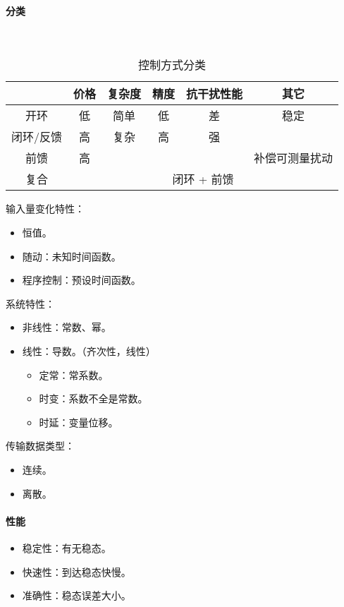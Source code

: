 \documentclass[
12pt, %
a4paper, 
oneside, %
headinclude,footinclude, %
]{scrartcl}
\begin{document}
\paragraph{分类}~\\
\begin{table}[H]
\centering
\begin{tabular}{|c|c|c|c|c|c|}
\hline
& 价格 & 复杂度 & 精度 & 抗干扰性能 & 其它 \\
\hline
开环 & 低 & 简单 & 低 & 差 & 稳定 \\
\hline
闭环/反馈 & 高 & 复杂 & 高 & 强 & \\
\hline
前馈 & 高 & & & & 补偿可测量扰动 \\
\hline
复合 & \multicolumn{5}{c|}{闭环 + 前馈} \\
\hline
\end{tabular}
\caption{控制方式分类}
\end{table}

\begin{minipage}[t]{0.35\textwidth}
输入量变化特性：
\begin{itemize}
\item 恒值。
\item 随动：未知时间函数。
\item 程序控制：预设时间函数。
\end{itemize}
\end{minipage}
\begin{minipage}[t]{0.35\textwidth}
系统特性：
\begin{itemize}
\item 非线性：常数、幂。
\item 线性：导数。（齐次性，线性）
\begin{itemize}
\item 定常：常系数。
\item 时变：系数不全是常数。
\item 时延：变量位移。
\end{itemize}
\end{itemize}
\end{minipage}
\begin{minipage}[t]{0.3\textwidth}
传输数据类型：
\begin{itemize}
\item 连续。
\item 离散。
\end{itemize}
\end{minipage}
\paragraph{性能}
\begin{itemize}
\item 稳定性：有无稳态。
\item 快速性：到达稳态快慢。
\item 准确性：稳态误差大小。
\end{itemize}
\end{document}
